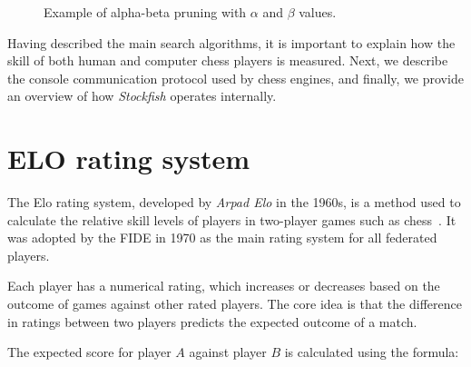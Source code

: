 \begin{figure}
    \caption{Example of alpha-beta pruning with $\alpha$ and $\beta$ values.}\label{fig:alphaBetaExample}
\end{figure}

\newpage

\noindent Having described the main search algorithms, it is important to explain how the skill of both human and computer chess players is measured. Next, we describe the console communication protocol used by chess engines, and finally, we provide an overview of how \textit{Stockfish} operates internally.

\section{ELO rating system}

The Elo rating system, developed by \textit{Arpad Elo} in the 1960s, is a method used to calculate the relative skill levels of players in two-player games such as chess~\cite{Elo}. It was adopted by the FIDE in 1970 as the main rating system for all federated players.

\vspace{1em}

\noindent Each player has a numerical rating, which increases or decreases based on the outcome of games against other rated players. The core idea is that the difference in ratings between two players predicts the expected outcome of a match.

\vspace{1em}

\noindent The expected score for player \( A \) against player \( B \) is calculated using the formula:


